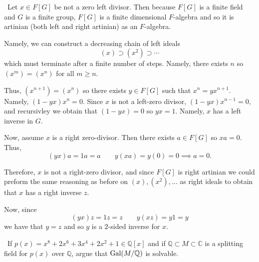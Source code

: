 \documentclass[12pt]{Qual}
\begin{document}
\begin{solution}$\,$
Let $x\in F[G]$ be not a zero left divisor. Then because $F[G]$ is a finite field and $G$ is a finite group, $F[G]$ is a finite dimensional $F$-algebra and so it is artinian (both left and right artinian) as an $F$-algebra.

Namely, we can construct a decreasing chain of left ideals $$(x)\supset (x^2)\supset\cdots$$ which must terminate after a finite number of steps. Namely, there exists $n$ so $(x^m)=(x^n)$ for all $m\ge n$.

Thus, $(x^{n+1})=(x^n)$ so there exists $y\in F[G]$ such that $x^n=yx^{n+1}$. Namely, $(1-yx)x^n=0$. Since $x$ is not a left-zero divisor, $(1-yx)x^{n-1}=0$, and recursivley we obtain that $(1-yx)=0$ so $yx=1$. Namely, $x$ has a left inverse in $G$.

Now, assume $x$ is a right zero-divisor. Then there exists $a\in F[G]$ so $xa=0$. Thus, $$(yx)a=1a=a\qquad y(xa)=y(0)=0\implies a=0.$$

Therefore, $x$ is not a right-zero divisor, and since $F[G]$ is right artinian we could preform the same reasoning as before on $(x),(x^2),...$ as right ideals to obtain that $x$ has a right inverse $z$.

Now, since $$(yx)z=1z=z\qquad y(xz)=y1=y$$ we have that $y=z$ and so $y$ is a $2$-sided inverse for $x.$
\end{solution}
\newpage



\begin{problem} $\,$
If $p(x)=x^8+2x^6+3x^4+2x^2+1\in\mathbb{Q}[x]$ and if $\mathbb{Q}\subset M\subset\mathbb{C}$ is a splitting field for $p(x)$ over $\mathbb{Q}$, argue that $\text{Gal}(M/\mathbb{Q})$ is solvable.
\end{problem}
\end{document}
